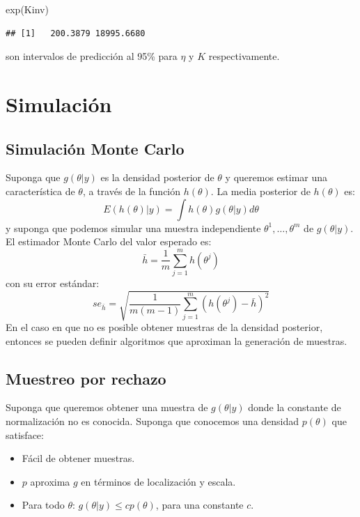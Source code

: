 \documentclass[
  12pt,
]{book}
\newenvironment{Shaded}{\begin{snugshade}}{\end{snugshade}}
\newcommand{\FunctionTok}[1]{\textcolor[rgb]{0.00,0.00,0.00}{#1}}
\newcommand{\NormalTok}[1]{#1}
\providecommand{\tightlist}{%
  \setlength{\itemsep}{0pt}\setlength{\parskip}{0pt}}
\theoremstyle{definition}
\theoremstyle{definition}
\theoremstyle{definition}
\theoremstyle{definition}
\theoremstyle{remark}
\begin{document}
\begin{Shaded}
\begin{Highlighting}[]
\FunctionTok{exp}\NormalTok{(Kinv)}
\end{Highlighting}
\end{Shaded}

\begin{verbatim}
## [1]   200.3879 18995.6680
\end{verbatim}

son intervalos de predicción al 95\% para \(\eta\) y \(K\) respectivamente.

\hypertarget{simulaciuxf3n}{%
\section{Simulación}\label{simulaciuxf3n}}

\hypertarget{simulaciuxf3n-monte-carlo}{%
\subsection{Simulación Monte Carlo}\label{simulaciuxf3n-monte-carlo}}

Suponga que \(g(\theta|y)\) es la densidad posterior de \(\theta\) y queremos estimar una característica de \(\theta\), a través de la función \(h(\theta)\). La media posterior de \(h(\theta)\) es:
\[E(h(\theta)|y)=\int h(\theta)g(\theta|y)d\theta\]
y suponga que podemos simular una muestra independiente \(\theta^1,\ldots,\theta^m\) de \(g(\theta|y)\). El estimador Monte Carlo del valor esperado es:
\[\bar h =\frac 1 m\sum_{j=1}^mh(\theta^j) \]
con su error estándar:
\[se_{\bar h}=\sqrt{\frac{1}{m(m-1)}\sum_{j=1}^m\left(h(\theta^j)-\bar h\right)^2}\]
En el caso en que no es posible obtener muestras de la densidad posterior, entonces se pueden definir algoritmos que aproximan la generación de muestras.

\hypertarget{muestreo-por-rechazo}{%
\subsection{Muestreo por rechazo}\label{muestreo-por-rechazo}}

Suponga que queremos obtener una muestra de \(g(\theta|y)\) donde la constante de normalización no es conocida. Suponga que conocemos una densidad \(p(\theta)\) que satisface:

\begin{itemize}
\tightlist
\item
  Fácil de obtener muestras.
\item
  \(p\) aproxima \(g\) en términos de localización y escala.
\item
  Para todo \(\theta\): \(g(\theta|y)\leq cp(\theta)\), para una constante \(c\).
\end{itemize}
\end{document}
